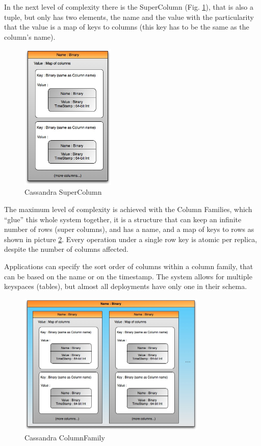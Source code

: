 In the next level of complexity there is the SuperColumn (Fig. \ref{fig:supercolumn}), that is also a tuple, but only has two elements, the name and the value with the particularity that the value is a map of keys to columns (this key has to be the same as the column's name).

\begin{figure}[htb]
  \begin{center}
    \leavevmode
    \includegraphics[width=0.4\textwidth]{images/supercolumn.jpg}
  \end{center}
  \caption{Cassandra SuperColumn}
  \label{fig:supercolumn}
\end{figure}

The maximum level of complexity is achieved with the Column Families, which ``glue'' this whole system together, it is a structure that can keep an infinite number of rows (super columns), and has a name, and a map of keys to rows as shown in picture \ref{fig:columnfamily}. Every operation under a single row key is atomic per replica, despite the number of columns affected.

Applications can specify the sort order of columns within a column family, that can be based on the name or on the timestamp. The system allows for multiple keyspaces (tables), but almost all deployments have only one in their schema.

\begin{figure}[!htb]
  \begin{center}
    \leavevmode
    \includegraphics[width=0.8\textwidth]{images/columnfamily.jpg}
  \end{center}
  \caption{Cassandra ColumnFamily}
  \label{fig:columnfamily}
\end{figure}

